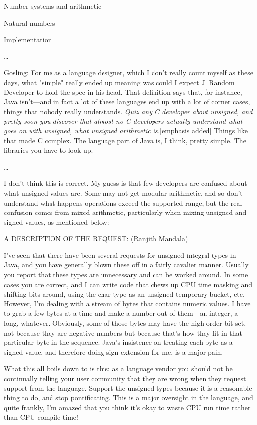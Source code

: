 \documentclass[12pt]{PalisadesLakesBook}
\begin{document}
\begin{plSection}{Number systems and arithmetic}
\begin{plSection}{Natural numbers}
\begin{plSection}{Implementation}
\begin{plQuote}
{\ldots

Gosling: For me as a language designer, 
which I don't really count myself as these days, 
what "simple" really ended up meaning was could I expect 
J. Random Developer to hold the spec in his head. 
That definition says that, for instance, Java isn't---and 
in fact a lot of these languages end up 
with a lot of corner cases, things that nobody really understands. 
\emph{Quiz any C developer about unsigned, 
and pretty soon you discover 
that almost no C developers actually understand what goes on 
with unsigned, what unsigned arithmetic is.}[emphasis added] 
Things like that made C complex. 
The language part of Java is, I think, pretty simple. 
The libraries you have to look up.}

\ldots
\end{plQuote}

I don't think this is correct.
My guess is that few developers are confused about
what unsigned values are.
Some may not get modular arithmetic,
and so don't understand what happens
operations exceed the supported range,
but the real confusion comes from mixed arithmetic, particularly
when mixing unsigned and signed values, as mentioned below:

\begin{plQuote}
{}{}%
{%
A DESCRIPTION OF THE REQUEST: (Ranjith Mandala)

I've seen that there have been several requests 
for unsigned integral types in Java, 
and you have generally blown these off 
in a fairly cavalier manner. 
Usually you report that these types are unnecessary 
and can be worked around. In some cases you are correct, 
and I can write code that chews up CPU time 
masking and shifting bits around, 
using the char type as an unsigned temporary bucket, etc. 
However, I'm dealing with a stream of bytes 
that contains numeric values. 
I have to grab a few bytes at a time 
and make a number out of them---an integer, a long, whatever. 
Obviously, some of those bytes may have the high-order bit set, 
not because they are negative numbers 
but because that's how they fit in that particular byte 
in the sequence. 
Java's insistence on treating each byte as a signed value, 
and therefore doing sign-extension for me, is a major pain.

What this all boils down to is this: 
as a language vendor you should not be continually telling 
your user community that they are wrong 
when they request support from the language. 
Support the unsigned types because it is a reasonable thing to do, 
and stop pontificating. 
This is a major oversight in the language, and quite frankly, 
I'm amazed that you think it's okay to waste CPU run time 
rather than CPU compile time!

}
\end{plQuote}
\end{plSection}
\end{plSection}
\end{plSection}
\end{document}
